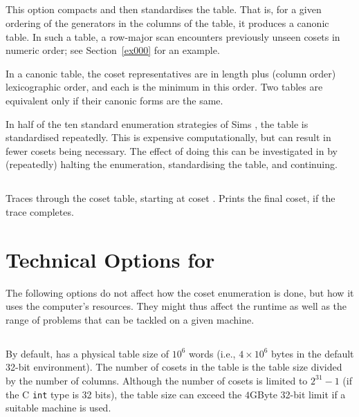 \subsection{}
\label{cmd:standard table}

This option compacts and then standardises the table.
That is, for a given ordering of the generators in the columns of the
  table, it produces a canonic table.
In such a table, a row-major scan encounters previously unseen cosets in
  numeric order; see Section~\ref{ex000} for an example.

In a canonic table, the coset representatives are in length plus (column
  order) lexicographic order, and each is the minimum in this order.
Two tables are equivalent only if their canonic forms are the same.

In half of the ten standard enumeration strategies of Sims \cite{Sim}, the
  table is standardised repeatedly.
This is expensive computationally, but can result in fewer cosets being
  necessary.
The effect of doing this can be investigated in {\ace} by (repeatedly)
  halting the enumeration, standardising the table, and continuing.

\subsection{}
\label{cmd:tw}
\label{cmd:trace word}

Traces  through the coset table, starting at coset .
Prints the final coset, if the trace completes.

\section{Technical Options for {\ace}}
\label{sec:tech}

The following options do not affect how the coset enumeration is done, but
how it uses the computer's resources. They might thus affect the runtime as
well as the range of problems that can be tackled on a given machine.

\subsection{}
\label{cmd:workspace}
By default, {\ace} has a physical table size of $10^6$ words (i.e., 
  $4 \times 10^6$ bytes in the default 32-bit environment).
The number of cosets in the table is the table size divided by the number of
columns.  Although the number of cosets is limited to $2^{31}-1$ (if the C
{\tt int} type is 32 bits), the table size can exceed the $4$GByte 32-bit limit
if a suitable machine is used.

